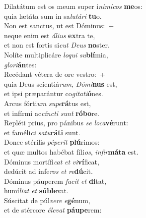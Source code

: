 \evenverse Dilatátum est os meum super i\textit{ni}\textit{mí}\textit{cos} \textbf{me}os:~\*\\
\evenverse quia lætáta sum in sa\textit{lu}\textit{tá}\textit{ri} \textbf{tu}o.\\
\oddverse Non est sanctus, ut est Dóminus:~+\\
\oddverse  neque enim est \textit{á}\textit{li}\textit{us} \textbf{ex}tra te,~\*\\
\oddverse et non est fortis si\textit{cut} \textit{De}\textit{us} \textbf{no}ster.\\
\evenverse Nolíte multiplicáre \textit{lo}\textit{qui} \textit{su}\textbf{blí}mia,~\*\\
\evenverse \textit{glo}\textit{ri}\textbf{án}tes:\\
\oddverse Recédant vétera de ore vestro:~+\\
\oddverse  quia Deus scientiá\textit{rum}, \textit{Dó}\textit{mi}\textbf{nus} est,~\*\\
\oddverse et ipsi præparántur co\textit{gi}\textit{ta}\textit{ti}\textbf{ó}nes.\\
\evenverse Arcus fórti\textit{um} \textit{su}\textit{pe}\textbf{rá}tus est,~\*\\
\evenverse et infírmi ac\textit{cín}\textit{cti} \textit{sunt} \textbf{ró}\textbf{bo}re.\\
\oddverse Repléti prius, pro pánibus \textit{se} \textit{lo}\textit{ca}\textbf{vé}runt:~\*\\
\oddverse et faméli\textit{ci} \textit{sa}\textit{tu}\textbf{rá}\textbf{ti} sunt.\\
\evenverse Donec stérilis \textit{pé}\textit{pe}\textit{rit} \textbf{plú}rimos:~\*\\
\evenverse et quæ multos habébat fíli\textit{os}, \textit{in}\textit{fir}\textbf{má}\textbf{ta} est.\\
\oddverse Dóminus mortífi\textit{cat} \textit{et} \textit{vi}\textbf{ví}ficat,~\*\\
\oddverse dedúcit ad ínfe\textit{ros} \textit{et} \textit{re}\textbf{dú}cit.\\
\evenverse Dóminus páuperem \textit{fa}\textit{cit} \textit{et} \textbf{di}tat,~\*\\
\evenverse humí\textit{li}\textit{at} \textit{et} \textbf{sú}\textbf{ble}vat.\\
\oddverse Súscitat de púl\textit{ve}\textit{re} \textit{e}\textbf{gé}num,~\*\\
\oddverse et de stércore \textit{é}\textit{le}\textit{vat} \textbf{páu}\textbf{pe}rem:\\
